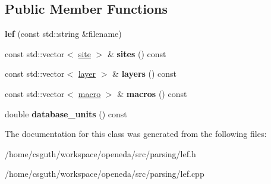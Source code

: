 \subsection*{Public Member Functions}
\begin{DoxyCompactItemize}
\item 
\hypertarget{classophidian_1_1parsing_1_1lef_a86c91c18a650b7aa34ed2d6335520331}{{\bfseries lef} (const std\-::string \&filename)}\label{classophidian_1_1parsing_1_1lef_a86c91c18a650b7aa34ed2d6335520331}

\item 
\hypertarget{classophidian_1_1parsing_1_1lef_adefce1e65cef9fdf68aa2a77403fb4d0}{const std\-::vector$<$ \hyperlink{structophidian_1_1parsing_1_1lef_1_1site}{site} $>$ \& {\bfseries sites} () const }\label{classophidian_1_1parsing_1_1lef_adefce1e65cef9fdf68aa2a77403fb4d0}

\item 
\hypertarget{classophidian_1_1parsing_1_1lef_a279403cbed8370db0ebfbc0aed93c9a7}{const std\-::vector$<$ \hyperlink{structophidian_1_1parsing_1_1lef_1_1layer}{layer} $>$ \& {\bfseries layers} () const }\label{classophidian_1_1parsing_1_1lef_a279403cbed8370db0ebfbc0aed93c9a7}

\item 
\hypertarget{classophidian_1_1parsing_1_1lef_ab0d77e65a5892f4cb50b866e00eb6a97}{const std\-::vector$<$ \hyperlink{structophidian_1_1parsing_1_1lef_1_1macro}{macro} $>$ \& {\bfseries macros} () const }\label{classophidian_1_1parsing_1_1lef_ab0d77e65a5892f4cb50b866e00eb6a97}

\item 
\hypertarget{classophidian_1_1parsing_1_1lef_a89cdc566c9dfae43ee3d2f3ed4f2c7d9}{double {\bfseries database\-\_\-units} () const }\label{classophidian_1_1parsing_1_1lef_a89cdc566c9dfae43ee3d2f3ed4f2c7d9}

\end{DoxyCompactItemize}


The documentation for this class was generated from the following files\-:\begin{DoxyCompactItemize}
\item 
/home/csguth/workspace/openeda/src/parsing/lef.\-h\item 
/home/csguth/workspace/openeda/src/parsing/lef.\-cpp\end{DoxyCompactItemize}
